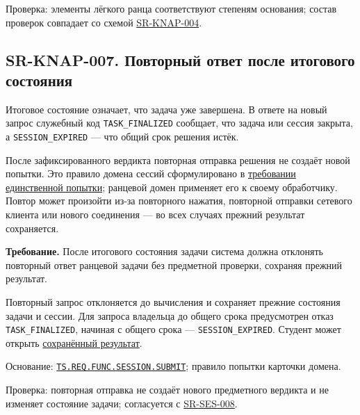 \documentclass[12pt,a4paper]{article}
\begin{document}
Проверка: элементы лёгкого ранца соответствуют степеням основания; состав проверок совпадает со схемой {\hyperlink{sr-knap-004}{SR-KNAP-004}}.

\subsection{SR-KNAP-007. Повторный ответ после итогового состояния}\label{sr-knap-007-ux43fux43eux432ux442ux43eux440ux43dux44bux439-ux43eux442ux432ux435ux442-ux43fux43eux441ux43bux435-ux438ux442ux43eux433ux43eux432ux43eux433ux43e-ux441ux43eux441ux442ux43eux44fux43dux438ux44f}

\hypertarget{sr-knap-007-повторный-ответ-после-итогового-состояния}{}

\hypertarget{sr-knap-007}{}

Итоговое состояние означает, что задача уже завершена. В ответе на новый запрос служебный код \texttt{TASK\_\allowbreak{}FINALIZED} сообщает, что задача или сессия закрыта, а \texttt{SESSION\_\allowbreak{}EXPIRED} --- что общий срок решения истёк.

После зафиксированного вердикта повторная отправка решения не создаёт новой попытки. Это правило домена сессий сформулировано в {\hyperlink{sr-ses-008-одна-предметная-попытка}{требовании единственной попытки}}; ранцевой домен применяет его к своему обработчику. Повтор может произойти из-за повторного нажатия, повторной отправки сетевого клиента или нового соединения --- во всех случаях прежний результат сохраняется.

\textbf{Требование.} После итогового состояния задачи система должна отклонять повторный ответ ранцевой задачи без предметной проверки, сохраняя прежний результат.

Повторный запрос отклоняется до вычисления и сохраняет прежние состояния задачи и сессии. Для запроса владельца до общего срока предусмотрен отказ \texttt{TASK\_\allowbreak{}FINALIZED}, начиная с общего срока --- \texttt{SESSION\_\allowbreak{}EXPIRED}. Студент может открыть {\hyperlink{sr-ses-014-получение-сохранённого-результата}{сохранённый результат}}.

Основание: {\href{../02\_Техническое\_задание/Техническое\_задание.pdf\#ts-req-func-session-submit}{\texttt{TS.\allowbreak{}REQ.\allowbreak{}FUNC.\allowbreak{}SESSION.\allowbreak{}SUBMIT}}}; правило попытки карточки домена.

Проверка: повторная отправка не создаёт нового предметного вердикта и не изменяет состояние задачи; согласуется с {\hyperlink{sr-ses-008}{SR-SES-008}}.
\end{document}
